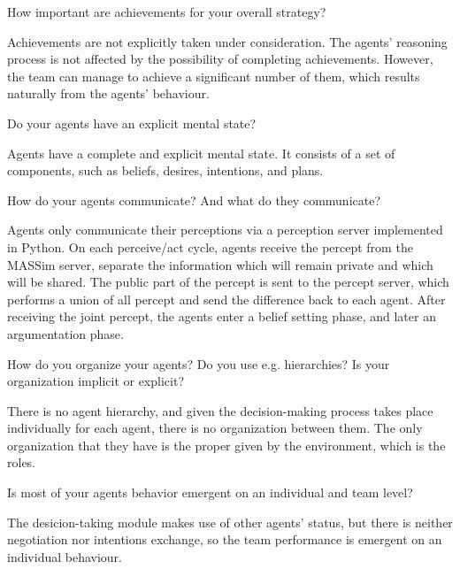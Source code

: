 \begin{question}
How important are achievements for your overall strategy?  
\end{question}

Achievements are not explicitly taken under consideration. The agents'
reasoning process is not affected by the possibility of completing
achievements.    However, the team can manage to achieve a significant number of
them, which results naturally from the agents' behaviour. 

\begin{question}
Do your agents have an explicit mental state?
\end{question}

Agents have a complete and explicit mental state. It consists of a set of
components, such as beliefs, desires, intentions, and plans. 

\begin{question}
How do your agents communicate? And what do they communicate?  
\end{question}

Agents only communicate their perceptions via a perception server implemented in
Python.  On each perceive/act cycle, agents receive the percept from the MASSim
server, separate the information which will remain private and which will be
shared.  The public part of the percept is sent to the percept server, which
performs a union of all percept and send the difference back to each agent.
After receiving the joint percept, the agents enter a belief setting phase, and
later an argumentation phase.

\begin{question}
How do you organize your agents? Do you use e.g. hierarchies? Is your
organization implicit or explicit?
\end{question}

There is no agent hierarchy, and given the decision-making process takes place
individually for each agent, there is no organization between them.  The only
organization that they have is the proper given by the environment, which is the
roles.

\begin{question}
Is most of your agents behavior emergent on an individual and team level?
\end{question}

The desicion-taking module makes use of other agents' status, but there is
neither negotiation nor intentions exchange, so the team performance is emergent
on an individual behaviour.

